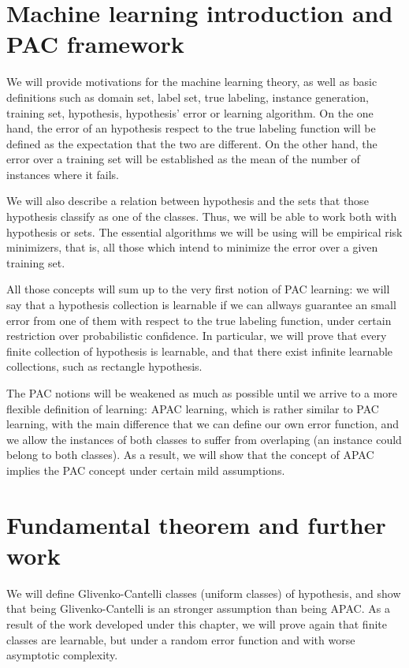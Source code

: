 \section*{Machine learning introduction and PAC framework}
We will provide motivations for the machine learning theory, as well as basic definitions such as domain set, label set, 
true labeling, instance generation, training set, hypothesis, hypothesis' error or learning algorithm. On the one hand, the 
error of an hypothesis respect to the true labeling function will be defined as the expectation that the two are different. 
On the other hand, the error over a training set will be established as the mean of the number of instances where it fails.

We will also describe a relation between hypothesis and the sets that those hypothesis classify as one of the classes. Thus,
we will be able to work both with hypothesis or sets. The essential algorithms we will be using will be empirical risk 
minimizers, that is, all those which intend to minimize the error over a given training set.

All those concepts will sum up to the very first notion of PAC learning: we will say that a hypothesis collection is 
learnable if we can allways guarantee an small error from one of them with respect to the true labeling function, under
certain restriction over probabilistic confidence. In particular, we will prove that every finite collection of hypothesis
is learnable, and that there exist infinite learnable collections, such as rectangle hypothesis.

The PAC notions will be weakened as much as possible until we arrive to a more flexible definition of learning: APAC 
learning, which is rather similar to PAC learning, with the main difference that we can define our own error function,
and we allow the instances of both classes to suffer from overlaping (an instance could belong to both classes). As
a result, we will show that the concept of APAC implies the PAC concept under certain mild assumptions.


\section*{Fundamental theorem and further work}

We will define Glivenko-Cantelli classes (uniform classes) of hypothesis, and show that being Glivenko-Cantelli is an
stronger assumption than being APAC. As a result of the work developed under this chapter, we will prove again that finite
classes are learnable, but under a random error function and with worse asymptotic complexity.

